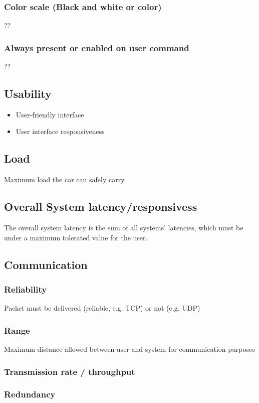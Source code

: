 \subsubsection{Color scale (Black and white or color)}
\label{sec:org468ee04}
??
\subsubsection{Always present or enabled on user command}
\label{sec:orgd585352}
??
\subsection{Usability}
\label{sec:org61632e0}
\begin{itemize}
\item User-friendly interface
\item User interface responsiveness
\end{itemize}
\subsection{Load}
\label{sec:orgca6a690}
Maximum load the car can safely carry.
\subsection{Overall System latency/responsivess}
\label{sec:org7fd1829}
The overall system latency is the sum of all systems' latencies, which must be
under a maximum tolerated value for the user.
\subsection{Communication}
\label{sec:org4241610}
\subsubsection{Reliability}
\label{sec:orgdcb920d}
Packet must be delivered (reliable, e.g. TCP) or not (e.g. UDP)
\subsubsection{Range}
\label{sec:org447a205}
Maximum distance allowed between user and system for communication purposes
\subsubsection{Transmission rate / throughput}
\label{sec:org10e75a5}
\subsubsection{Redundancy}
\label{sec:orgc5933fc}
